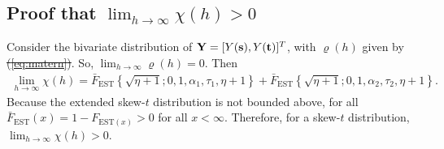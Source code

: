 \documentclass[useAMS,usenatbib,referee]{biomweb}
\providecommand{\DIFadd}[1]{{\protect\color{blue}\uwave{#1}}} %
\providecommand{\DIFdel}[1]{{\protect\color{red}\sout{#1}}}                      %
\providecommand{\DIFaddbegin}{} %
\providecommand{\DIFaddend}{} %
\providecommand{\DIFdelbegin}{} %
\providecommand{\DIFdelend}{} %
\begin{document}
\subsection*{Proof that $\lim_{h \rightarrow \infty} \chi(h) > 0$}
Consider the bivariate distribution of \DIFdelbegin \DIFdel{$\mbox{\bf Y} = [Y(\mbox{\bf s}), Y(\mbox{\bf t})]^T$}\DIFdelend \DIFaddbegin \DIFadd{$\bY = [Y(\bs), Y(\bt)]^\top$}\DIFaddend , with $\varrho(h)$ given by \DIFdelbegin \DIFdel{(\ref{eq:matern})}\DIFdelend \DIFaddbegin {}\DIFaddend .
So, $\lim_{h \rightarrow \infty} \varrho(h) = 0$.
Then
\begin{align}
  \lim_{h \rightarrow \infty} \chi(h) = \bar{F}_{\text{EST}}\left\{ \sqrt{\eta + 1}; 0, 1, \alpha_1, \tau_1, \eta + 1 \right\} + \bar{F}_{\text{EST}}\left\{ \sqrt{\eta + 1}; 0, 1, \alpha_2, \tau_2, \eta + 1 \right\}.
\end{align}
Because the extended skew-$t$ distribution is not bounded above, for all $\bar{F}_{\text{EST}}(x) = 1 - F_{\text{EST} (x)} > 0$ for all $x < \infty$.
Therefore, for a skew-$t$ distribution, $\lim_{h \rightarrow \infty} \chi(h) > 0$.
\end{document}
